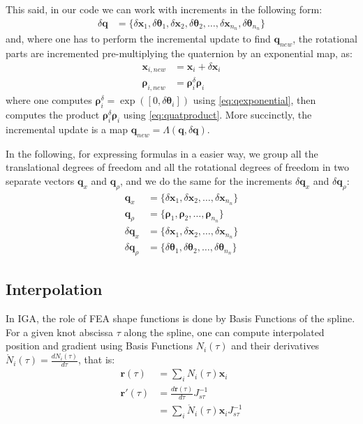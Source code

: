 \documentclass[review]{elsarticle}
\def\avect#1{{\boldsymbol{#1}}}
\begin{document}
This said, in our code we can work with increments in the following form:
%
\begin{align}
\delta\avect{q} &= \{ \delta\avect{x}_1, \delta\avect{\theta}_1, \delta\avect{x}_2, \delta\avect{\theta}_2, \ldots, \delta\avect{x}_{n_n}, \delta\avect{\theta}_{n_n} \} 
\end{align}
%
and, where one has to perform the incremental update to find $\avect{q}_{new}$, the rotational parts are incremented pre-multiplying the quaternion by an exponential map, as:
%
\begin{align}
\avect{x}_{i, new}    &= \avect{x}_i + \delta\avect{x}_i \label{eq:xinc}
\\ 
\avect{\rho}_{i, new} &= \avect{\rho}^{\delta}_{i} \avect{\rho}_{i}
\label{eq:rinc}
\end{align}
%
where one computes 
$\avect{\rho}^{\delta}_{i} = \exp ([0, \delta\avect{\theta}_{i}]) $ using \eqref{eq:qexponential}, then computes the product $\avect{\rho}^{\delta}_{i} \avect{\rho}_{i}$ using \eqref{eq:quatproduct}.
More succinctly, the incremental update is a map
$\avect{q}_{new}=\Lambda(\avect{q},\delta\avect{q})$.


In the following, for expressing formulas in a easier way, we group all the translational degrees of freedom and all the rotational degrees of freedom in two separate vectors $\avect{q}_x$ and $\avect{q}_{\rho}$, and we do the same for the increments 
$\delta\avect{q}_x$ and $\delta\avect{q}_{\rho}$:
%
\begin{align}
\avect{q}_x &= \{ \delta\avect{x}_1, \delta\avect{x}_2, \ldots, \delta\avect{x}_{n_n} \} \\
\avect{q}_{\rho} &= \{ \avect{\rho}_1, \avect{\rho}_2, \ldots, \avect{\rho}_{n_n} \} \\
\delta\avect{q}_x &= \{ \delta\avect{x}_1, \delta\avect{x}_2, \ldots, \delta\avect{x}_{n_n} \} \\
\delta\avect{q}_{\rho} &= \{ \delta\avect{\theta}_1, \delta\avect{\theta}_2, \ldots, \delta\avect{\theta}_{n_n} \}
\end{align}

\subsection{Interpolation}

In IGA, the role of FEA shape functions is done by Basis Functions of the spline.
For a given knot abscissa $\tau$ along the spline, one can compute interpolated position and gradient using Basis Functions $N_i(\tau)$ and their derivatives $\mathring{N}_i(\tau) = \frac{dN_i(\tau)}{d\tau}$, that is:
%
\begin{align}
\avect{r}(\tau)  &= \sum_i N_i(\tau) \avect{x}_i  \\
\avect{r}'(\tau) &= \frac{d\avect{r}(\tau)}{d\tau} J^{-1}_{s\tau}    \\
                 &= \sum_i \mathring{N}_i(\tau) \avect{x}_i  J^{-1}_{s\tau} 
\end{align}
\end{document}
